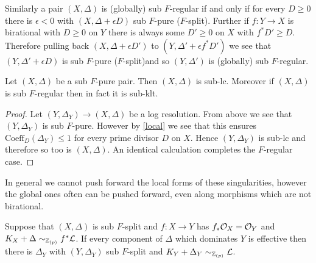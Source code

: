Similarly a pair $(X,\Delta)$ is (globally) sub $F$-regular if and only if for every $D \geq 0$ there is $\epsilon<0$ with $(X,\Delta+\epsilon D)$ sub $F$-pure ($F$-split). Further if $f:Y \to X$ is birational with $D \geq 0$ on $Y$ there is always some $D' \geq 0$ on $X$  with $f^{*}D' \geq D$. Therefore pulling back $(X,\Delta +\epsilon D')$ to $(Y,\Delta'+\epsilon f^{*}D')$ we see that  $(Y,\Delta'+\epsilon D)$ is sub $F$-pure ($F$-split)and so $(Y,\Delta')$ is (globally) sub $F$-regular.


\begin{theorem}
	
	Let $(X,\Delta)$ be a sub $F$-pure pair. Then $(X,\Delta)$ is sub-lc. Moreover if $(X,\Delta)$ is sub $F$-regular then in fact it is sub-klt.
	
\end{theorem}

\begin{proof}
		Let $(Y,\Delta_{Y}) \to (X,\Delta)$ be a log resolution. From above we see that $(Y,\Delta_{Y})$ is sub $F$-pure. However by \autoref{local} we see that this ensures $\text{Coeff}_{D}(\Delta_{Y}) \leq 1$ for every prime divisor $D$ on $X$. Hence $(Y,\Delta_{Y})$ is sub-lc and therefore so too is $(X,\Delta)$. An identical calculation completes the $F$-regular case.
\end{proof}

In general we cannot push forward the local forms of these singularities, however the global ones often can be pushed forward, even along morphisms which are not birational. 

\begin{lemma}
	Suppose that $(X,\Delta)$ is sub $F$-split and $f:X \to Y$ has $f_{*}\mathcal{O}_{X} =\mathcal{O}_{Y}$ and $K_{X}+\Delta \sim_{\mathbb{Z}_{(p)}} f^{*}\mathcal{L}$. If every component of $\Delta$ which dominates $Y$ is effective then there is $\Delta_{Y}$ with $(Y,\Delta_{Y})$ sub $F$-split and $K_{Y}+\Delta_{Y} \sim_{\mathbb{Z}_{(p)}} \mathcal{L}$.
\end{lemma}

